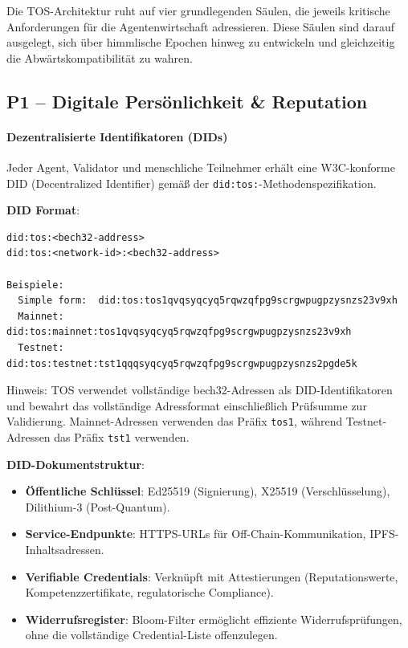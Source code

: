 \documentclass[11pt]{article}
\begin{document}
Die TOS-Architektur ruht auf vier grundlegenden Säulen, die jeweils kritische Anforderungen für die Agentenwirtschaft adressieren. Diese Säulen sind darauf ausgelegt, sich über himmlische Epochen hinweg zu entwickeln und gleichzeitig die Abwärtskompatibilität zu wahren.

\subsection{P1 -- Digitale Persönlichkeit \& Reputation}
\label{sec:pillar-identity}

\paragraph{Dezentralisierte Identifikatoren (DIDs)}
Jeder Agent, Validator und menschliche Teilnehmer erhält eine W3C-konforme DID (Decentralized Identifier) gemäß der \texttt{did:tos:}-Methodenspezifikation.

\textbf{DID Format}:
\begin{verbatim}
did:tos:<bech32-address>
did:tos:<network-id>:<bech32-address>

Beispiele:
  Simple form:  did:tos:tos1qvqsyqcyq5rqwzqfpg9scrgwpugpzysnzs23v9xh
  Mainnet:      did:tos:mainnet:tos1qvqsyqcyq5rqwzqfpg9scrgwpugpzysnzs23v9xh
  Testnet:      did:tos:testnet:tst1qqqsyqcyq5rqwzqfpg9scrgwpugpzysnzs2pgde5k
\end{verbatim}
Hinweis: TOS verwendet vollständige bech32-Adressen als DID-Identifikatoren und bewahrt das vollständige Adressformat einschließlich Prüfsumme zur Validierung. Mainnet-Adressen verwenden das Präfix \texttt{tos1}, während Testnet-Adressen das Präfix \texttt{tst1} verwenden.

\textbf{DID-Dokumentstruktur}:
\begin{itemize}[noitemsep]
  \item \textbf{Öffentliche Schlüssel}: Ed25519 (Signierung), X25519 (Verschlüsselung), Dilithium-3 (Post-Quantum).
  \item \textbf{Service-Endpunkte}: HTTPS-URLs für Off-Chain-Kommunikation, IPFS-Inhaltsadressen.
  \item \textbf{Verifiable Credentials}: Verknüpft mit Attestierungen (Reputationswerte, Kompetenzzertifikate, regulatorische Compliance).
  \item \textbf{Widerrufsregister}: Bloom-Filter ermöglicht effiziente Widerrufsprüfungen, ohne die vollständige Credential-Liste offenzulegen.
\end{itemize}
\end{document}
